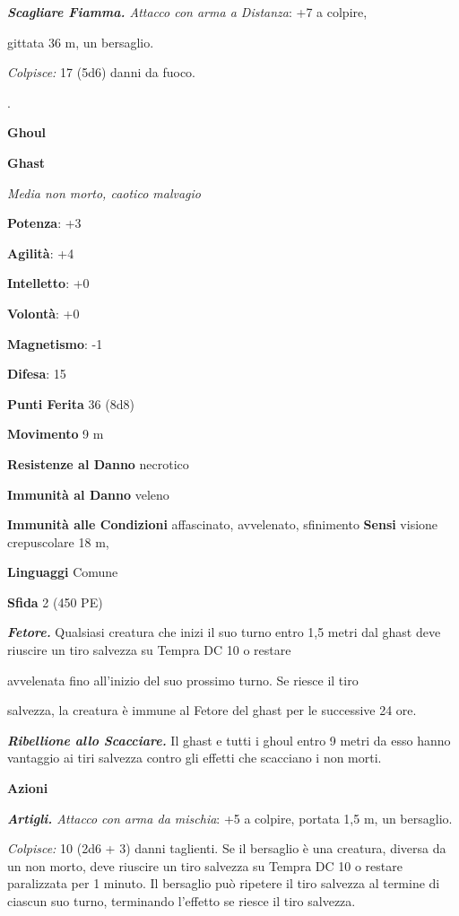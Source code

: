 \begin{multicols}{2}
\emph{\textbf{Scagliare Fiamma.} Attacco con arma a Distanza}: +7 a
colpire,

gittata 36 m, un bersaglio.

\emph{Colpisce:} 17 (5d6) danni da fuoco.

.

\textbf{Ghoul}

\textbf{Ghast}

\emph{Media non morto, caotico malvagio}

\textbf{Potenza}: +3

\textbf{Agilità}: +4

\textbf{Intelletto}: +0

\textbf{Volontà}: +0

\textbf{Magnetismo}: -1

\textbf{Difesa}: 15

\textbf{Punti Ferita} 36 (8d8)

\textbf{Movimento} 9 m

\textbf{Resistenze al Danno} necrotico

\textbf{Immunità al Danno} veleno

\textbf{Immunità alle Condizioni} affascinato, avvelenato, sfinimento
\textbf{Sensi} visione crepuscolare 18 m, 

\textbf{Linguaggi} Comune

\textbf{Sfida} 2 (450 PE)

\emph{\textbf{Fetore.}} Qualsiasi creatura che inizi il suo turno entro
1,5 metri dal ghast deve riuscire un tiro salvezza su Tempra DC 10
o restare

avvelenata fino all'inizio del suo prossimo turno. Se riesce il tiro

salvezza, la creatura è immune al Fetore del ghast per le successive 24
ore.

\emph{\textbf{Ribellione allo Scacciare.}} Il ghast e tutti i ghoul
entro 9 metri da esso hanno vantaggio ai tiri salvezza contro gli
effetti che scacciano i non morti.

\textbf{Azioni}

\emph{\textbf{Artigli.} Attacco con arma da mischia}: +5 a colpire,
portata 1,5 m, un bersaglio.

\emph{Colpisce:} 10 (2d6 + 3) danni taglienti. Se il bersaglio è una
creatura, diversa da un non morto, deve riuscire un tiro salvezza su Tempra DC 10 o restare paralizzata per 1 minuto. Il bersaglio può
ripetere il tiro salvezza al termine di ciascun suo turno, terminando
l'effetto se riesce il tiro salvezza.


\end{multicols}

